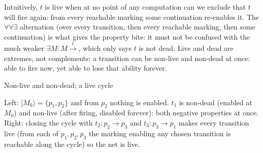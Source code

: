 Intuitively, $t$ is live when at no point of any computation can we exclude that $t$ will fire again: from every reachable marking some continuation re-enables it. The $\forall\forall\exists$ alternation (over every transition, then every reachable marking, then some continuation) is what gives the property bite: it must not be confused with the much weaker $\exists M : M \xrightarrow{t}$, which only says $t$ is not dead. Live and dead are extremes, not complements: a transition can be non-live and non-dead at once: able to fire now, yet able to lose that ability forever.

\begin{examplebox}{Non-live and non-dead; a live cycle}
\begin{center}
\end{center}
Left: $[M_0\rangle = \{p_1, p_2\}$ and from $p_2$ nothing is enabled. $t_1$ is non-dead (enabled at $M_0$) and non-live (after firing, disabled forever): both negative properties at once. Right: closing the cycle with $t_2 : p_2 \to p_3$ and $t_3 : p_3 \to p_1$ makes every transition live (from each of $p_1, p_2, p_3$ the marking enabling any chosen transition is reachable along the cycle) so the net is live.
\end{examplebox}

